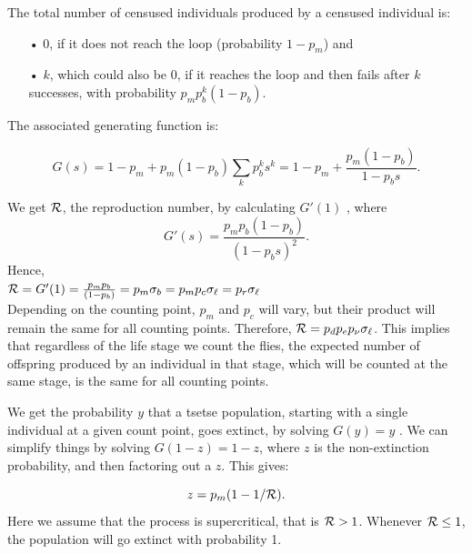 \documentclass[smallextended]{svjour3}
\newcommand{\comment}[3]{\textcolor{#1}{\textbf{[#2: }\textit{#3}\textbf{]}}}
\newcommand{\jd}[1]{\comment{cyan}{JD}{#1}}
\newcommand{\eb}[1]{\comment{blue}{EB}{#1}}
\newcommand{\Rx}{\ensuremath{\cal R}}
\begin{document}
The total number of censused individuals produced by a censused individual is: 

\begin{itemize}
	\item [•] 0, if it does not reach the loop (probability $1-p_m$) and
	\item [•] $k$, which could also be 0, if it reaches the loop and then fails after $k$ successes, with probability $p_m p_b^k (1-p_b)$.\\
\end{itemize}  

The associated generating function  is:

$$G(s) = 1-p_m + p_m (1-p_b) \sum_k p_b^k s^k = 1-p_m + \frac{p_m (1-p_b)}{1-p_b s}.$$

We get ${\cal R}$, the reproduction number, by calculating $G'(1)$ \cite{bartlett1949some}, where $$G'(s) = \frac{p_m p_b (1-p_b)}{(1-p_b s)^2}.$$  Hence, \\

$ {\cal R}= G'(1) = \frac{p_m p_b}{(1-p_b)} = p_m \sigma_b = p_mp_c \sigma_\ell =  p_r\sigma_\ell$ \\
Depending on the counting point, $p_m$ and $p_c$ will vary, but their product will remain the same for all counting  points. Therefore, ${\cal R} =p_dp_ep_{\nu} \sigma_{\ell}$. This implies that regardless of the life stage we count the flies, the expected number of offspring produced by an individual in that stage, which will be counted at the same stage, is the same for all counting points.


We get the probability $y$ that a tsetse population, starting with a single individual at a given count point, goes extinct, by solving $G(y) = y$ \cite{bartlett1949some}. We can simplify things by solving   $G(1-z) = 1-z$, where $z$ is the non-extinction probability, and then factoring out a $z$. This gives:

$$ z = p_m(1-1/{\cal R}).$$  
Here we assume that the process is supercritical, that is ${\cal R} > 1$. Whenever ${\cal R} \leq 1$, the population will go extinct with probability 1. 
\end{document}
